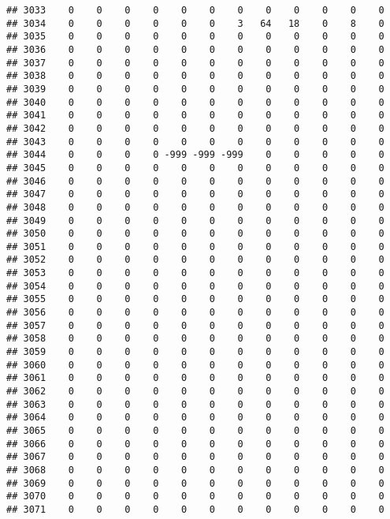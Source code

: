 \documentclass[]{article}
\begin{document}
\begin{verbatim}
## 3033    0    0    0    0    0    0    0    0    0    0    0    0
## 3034    0    0    0    0    0    0    3   64   18    0    8    0
## 3035    0    0    0    0    0    0    0    0    0    0    0    0
## 3036    0    0    0    0    0    0    0    0    0    0    0    0
## 3037    0    0    0    0    0    0    0    0    0    0    0    0
## 3038    0    0    0    0    0    0    0    0    0    0    0    0
## 3039    0    0    0    0    0    0    0    0    0    0    0    0
## 3040    0    0    0    0    0    0    0    0    0    0    0    0
## 3041    0    0    0    0    0    0    0    0    0    0    0    0
## 3042    0    0    0    0    0    0    0    0    0    0    0    0
## 3043    0    0    0    0    0    0    0    0    0    0    0    0
## 3044    0    0    0    0 -999 -999 -999    0    0    0    0    0
## 3045    0    0    0    0    0    0    0    0    0    0    0    0
## 3046    0    0    0    0    0    0    0    0    0    0    0    0
## 3047    0    0    0    0    0    0    0    0    0    0    0    0
## 3048    0    0    0    0    0    0    0    0    0    0    0    0
## 3049    0    0    0    0    0    0    0    0    0    0    0    0
## 3050    0    0    0    0    0    0    0    0    0    0    0    0
## 3051    0    0    0    0    0    0    0    0    0    0    0    0
## 3052    0    0    0    0    0    0    0    0    0    0    0    0
## 3053    0    0    0    0    0    0    0    0    0    0    0    0
## 3054    0    0    0    0    0    0    0    0    0    0    0    0
## 3055    0    0    0    0    0    0    0    0    0    0    0    0
## 3056    0    0    0    0    0    0    0    0    0    0    0    0
## 3057    0    0    0    0    0    0    0    0    0    0    0    0
## 3058    0    0    0    0    0    0    0    0    0    0    0    0
## 3059    0    0    0    0    0    0    0    0    0    0    0    0
## 3060    0    0    0    0    0    0    0    0    0    0    0    0
## 3061    0    0    0    0    0    0    0    0    0    0    0    0
## 3062    0    0    0    0    0    0    0    0    0    0    0    0
## 3063    0    0    0    0    0    0    0    0    0    0    0    0
## 3064    0    0    0    0    0    0    0    0    0    0    0    0
## 3065    0    0    0    0    0    0    0    0    0    0    0    0
## 3066    0    0    0    0    0    0    0    0    0    0    0    0
## 3067    0    0    0    0    0    0    0    0    0    0    0    0
## 3068    0    0    0    0    0    0    0    0    0    0    0    0
## 3069    0    0    0    0    0    0    0    0    0    0    0    0
## 3070    0    0    0    0    0    0    0    0    0    0    0    0
## 3071    0    0    0    0    0    0    0    0    0    0    0    0

\end{verbatim}
\end{document}
